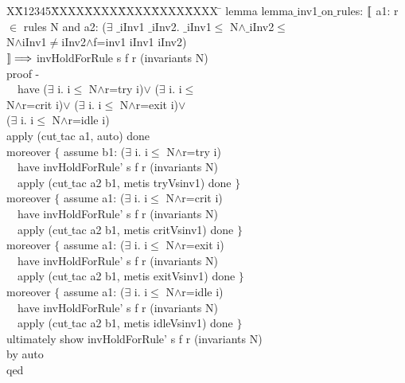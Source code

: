 \documentclass{llncs}
\newlength{\fminilength}
\newenvironment{fmini}[1][\linewidth]
  {\setlength{\fminilength}{#1\fboxsep-2\fboxrule}%
   \vspace{2ex}\noindent\begin{lrbox}{\fminibox}\begin{minipage}{\fminilength}%
   \mbox{ }\hfill\vspace{-2.5ex}}%
  {\end{minipage}\end{lrbox}\vspace{1ex}\hspace{0ex}%
   \framebox{\usebox{\fminibox}}}
\newenvironment{specification}
{\noindent\scriptsize
\tt\begin{fmini}\begin{tabbing}X\=X12345\=XXXX\=XXXX\=XXXX\=XXXX\=XXXX
\=\+\kill} {\end{tabbing}\normalfont\end{fmini}}
\def \twoSpaces {\ \ }
\def \iInv {iInv}
\begin{document}
\begin{specification}
lemma lemma$\_$inv1$\_$on$\_$rules:
  $\emph{$\mathopen{\lbrack\mkern-3mu\lbrack}$}$ a1:
r $\in$ rules N
 and a2:
($\exists$ $\_$iInv1 $\_$iInv2. $\_$iInv1$\le$
N$\wedge$$\_$iInv2$\le$\\
N$\wedge$\iInv1$\neq$\iInv2$\wedge$f=inv1  \iInv1 \iInv2)\\

  $\emph{$\mathclose{\rbrack\mkern-3mu\rbrack}$}\Longrightarrow$
invHoldForRule s f r (invariants N)\\

  proof -\\
\twoSpaces  have
($\exists$ i. i$\le$
N$\wedge$r=try  i)$\vee$
    ($\exists$ i. i$\le$\\
N$\wedge$r=crit  i)$\vee$
    ($\exists$ i. i$\le$
N$\wedge$r=exit  i)$\vee$\\
    ($\exists$ i. i$\le$
N$\wedge$r=idle  i)\\

  apply (cut$\_$tac a1, auto) done\\
    moreover $\{$      assume b1:
($\exists$ i. i$\le$
N$\wedge$r=try  i)\\

\twoSpaces      have invHoldForRule' s f r (invariants N)\\

\twoSpaces      apply (cut$\_$tac a2 b1, metis tryVsinv1) done
    $\}$\\


    moreover $\{$ assume a1:
($\exists$ i. i$\le$
N$\wedge$r=crit  i)\\

\twoSpaces      have
invHoldForRule' s f r (invariants N)\\

\twoSpaces      apply (cut$\_$tac a2 b1, metis critVsinv1) done
    $\}$\\


    moreover $\{$
      assume a1:
($\exists$ i. i$\le$
N$\wedge$r=exit  i)\\

\twoSpaces      have
invHoldForRule' s f r (invariants N)\\

\twoSpaces      apply (cut$\_$tac a2 b1, metis exitVsinv1) done
    $\}$\\


    moreover $\{$ assume a1:
($\exists$ i. i$\le$
N$\wedge$r=idle  i)\\

\twoSpaces      have
invHoldForRule' s f r (invariants N)\\

\twoSpaces      apply (cut$\_$tac a2 b1, metis idleVsinv1) done
    $\}$\\


  ultimately show invHoldForRule' s f r (invariants N)\\
  by auto\\
qed\\

\end{specification}
\end{document}
